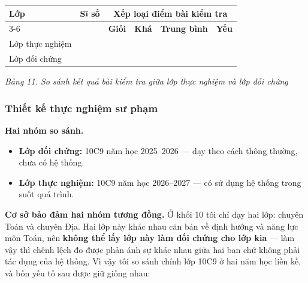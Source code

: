 \begin{center}
\begin{tabular}{|p{3.4cm}|c|c|c|c|c|}
\hline
\multirow{2}{*}{\textbf{Lớp}} & \multirow{2}{*}{\textbf{Sĩ số}} &
\multicolumn{4}{c|}{\textbf{Xếp loại điểm bài kiểm tra}} \\ \cline{3-6}
 & & \textbf{Giỏi} & \textbf{Khá} & \textbf{Trung bình} & \textbf{Yếu} \\ \hline
Lớp thực nghiệm \dotfill & & & & & \\ \hline
Lớp đối chứng \dotfill & & & & & \\ \hline
\end{tabular}
\end{center}
\textit{Bảng 11. So sánh kết quả bài kiểm tra giữa lớp thực nghiệm và lớp đối chứng}


\subsubsection{Thiết kế thực nghiệm sư phạm}

\textbf{Hai nhóm so sánh.}

\begin{itemize}[leftmargin=1.2cm, itemsep=3pt]
  \item \textbf{Lớp đối chứng:} 10C9 năm học 2025--2026 --- dạy theo cách
        thông thường, chưa có hệ thống.
  \item \textbf{Lớp thực nghiệm:} 10C9 năm học 2026--2027 --- có sử dụng hệ
        thống trong suốt quá trình.
\end{itemize}

\textbf{Cơ sở bảo đảm hai nhóm tương đồng.} Ở khối 10 tôi chỉ dạy hai lớp:
chuyên Toán và chuyên Địa. Hai lớp này khác nhau căn bản về định hướng và năng
lực môn Toán, nên \textbf{không thể lấy lớp này làm đối chứng cho lớp kia} ---
làm vậy thì chênh lệch đo được phản ánh sự khác nhau giữa hai ban chứ không phải
tác dụng của hệ thống. Vì vậy tôi so sánh chính lớp 10C9 ở hai năm học liền kề,
và bốn yếu tố sau được giữ giống nhau:

